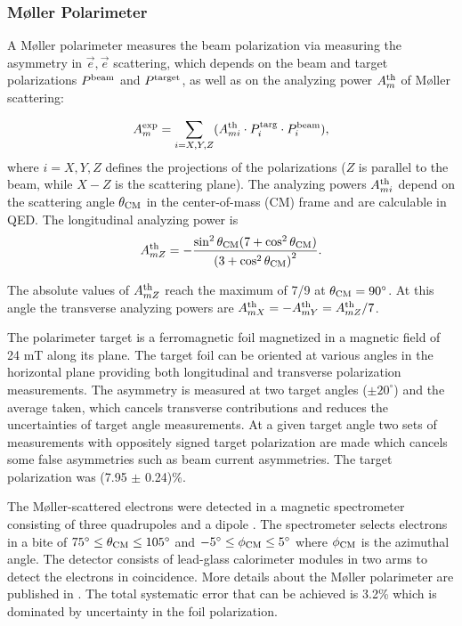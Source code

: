 \subsubsection{M{\o}ller Polarimeter}
\label{sec:moller_method}

A M{\o}ller polarimeter measures the beam polarization
via measuring the asymmetry in
$\vec e, \vec e$ scattering, which depends on the
beam and target polarizations $P^{\rm beam}$ and $P^{\rm target}$, 
as well as on the
analyzing power $A^{\rm th}_m$ of M{\o}ller scattering:

\begin{equation}
\label{moller_asy}
         A^{\rm exp}_m = 
            \sum_{i=X,Y,Z} (A^{\rm th}_{mi}\cdot{}{P}^{\rm targ}_{i}\cdot{}{P}^{\rm beam}_{i}) ,
\end{equation}
where $i = X,Y,Z$ defines the projections of the polarizations
($Z$ is parallel to the beam, while $X-Z$ is the scattering plane).
The analyzing powers $A^{\rm th}_{mi}$ depend on 
the scattering angle $\theta_{\rm CM}$ in the
center-of-mass (CM) frame 
and are calculable in QED.
The longitudinal analyzing power is
\begin{equation}
\label{eq:moller_apower}
A^{\rm th}_{mZ} = - \frac{ \sin^2 \theta_{\rm CM} 
( 7 + \cos^2 \theta_{\rm CM}) }
{ {(3 + \cos^2 \theta_{\rm CM})}^2 }.
\end{equation}

The absolute values of $A^{\rm th}_{mZ}$ reach the maximum of 7/9 
at $\theta_{\rm CM}=90^{\circ}$. 
At this angle the transverse analyzing powers are $A^{\rm th}_{mX}=-A^{\rm th}_{mY}=A^{\rm th}_{mZ}/7$.

The polarimeter target is a ferromagnetic foil
magnetized in a magnetic field of 24 mT along its plane.
The target foil can be oriented at various angles
in the horizontal plane providing both
longitudinal and transverse polarization
measurements.  The asymmetry is measured
at two target angles ($\pm 20^{\circ}$) 
and the average taken, which cancels
transverse contributions and reduces
the uncertainties of target angle measurements.
At a given target angle two sets of measurements
with oppositely signed target polarization
are made which cancels some false asymmetries
such as beam current asymmetries.  The target
polarization was (7.95 $\pm$ 0.24)\%.

The M{\o}ller-scattered electrons were
detected in a magnetic spectrometer 
consisting
of three quadrupoles and a dipole \cite{A-NIM}.
The spectrometer selects electrons in a
bite of $75^{\circ} \le \theta_{\rm CM} \le
105^{\circ}$ and $-5^{\circ} \le \phi_{\rm CM}
\le 5^{\circ}$ where $\phi_{\rm CM}$ is
the azimuthal angle.  The detector consists
of lead-glass calorimeter modules in two 
arms to detect the electrons in coincidence.
More details about the M{\o}ller polarimeter
are published in \cite{A-NIM}.  The total
systematic error that can be achieved is
3.2\% which is dominated by uncertainty in
the foil polarization.

